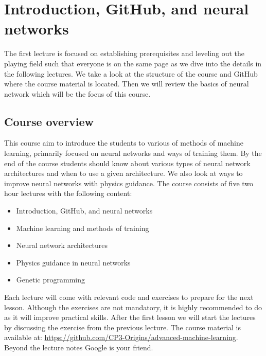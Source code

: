 \documentclass[12pt,a4paper]{article} %
\title{\titel}
\author{\navn}
\date{\dato}
\numberwithin{equation}{section}
\begin{document}
	
	\maketitle

\section{Introduction, GitHub, and neural networks}\label{sec:lecture1}
	The first lecture is focused on establishing prerequisites and leveling out the playing field such that everyone is on the same page as we dive into the details in the following lectures. We take a look at the structure of the course and GitHub where the course material is located. Then we will review the basics of neural network which will be the focus of this course.
	
	\subsection{Course overview}
		This course aim to introduce the students to various of methods of machine learning, primarily focused on neural networks and ways of training them. By the end of the course students should know about various types of neural network architectures and when to use a given architecture. We also look at ways to improve neural networks with physics guidance. The course consists of five two hour lectures with the following content:
		\begin{itemize}
			\item Introduction, GitHub, and neural networks
			\item Machine learning and methods of training
			\item Neural network architectures
			\item Physics guidance in neural networks
			\item Genetic programming
		\end{itemize}
		Each lecture will come with relevant code and exercises to prepare for the next lesson. Although the exercises are not mandatory, it is highly recommended to do as it will improve practical skills. After the first lesson we will start the lectures by discussing the exercise from the previous lecture. The course material is available at: \url{https://github.com/CP3-Origins/advanced-machine-learning}. Beyond the lecture notes Google is your friend.
	
\end{document}
